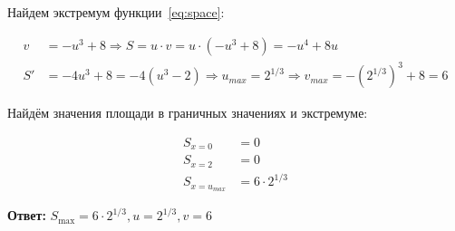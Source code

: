 {}\documentclass{article}
\begin{document}
Найдем экстремум функции~\eqref{eq:space}:

\begin{align*}
    v &= -u^3 + 8 \Rightarrow S = u \cdot v = u \cdot (-u^3 + 8) = -u^4+8u \\
    S' &= -4u^3+8 = -4(u^3-2) \Rightarrow u_{max} = 2^{1/3} \Rightarrow v_{max} = -(2^{1/3})^3 + 8 = 6
    \label{eq:equation2}
\end{align*}

Найдём значения площади в граничных значениях и экстремуме:

\begin{align*}
    S_{x=0} &= 0 \\
    S_{x=2} &= 0 \\
    S_{x = u_{max}} &= 6 \cdot 2^{1/3}
    \label{eq:equation3}
\end{align*}

\textbf{Ответ:} \(S_{\max} = 6 \cdot 2^{1/3}, u = 2^{1/3}, v = 6\)
\end{document}
